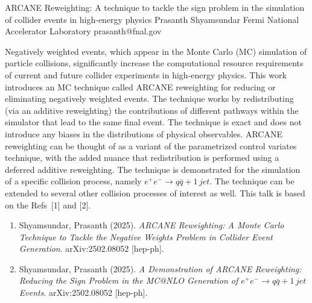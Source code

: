 \begin{talk}
  {ARCANE Reweighting: A technique to tackle the sign problem in the simulation of collider events in high-energy physics}%
  {Prasanth Shyamsundar}%
  {Fermi National Accelerator Laboratory}%
  {prasanth@fnal.gov}%
  {}%
  
    
   

Negatively weighted events, which appear in the Monte Carlo (MC) simulation of particle collisions, significantly increase the computational resource requirements of current and future collider experiments in high-energy physics. This work introduces an MC technique called ARCANE reweighting for reducing or eliminating negatively weighted events. The technique works by redistributing (via an additive reweighting) the contributions of different pathways within the simulator that lead to the same final event. The technique is exact and does not introduce any biases in the distributions of physical observables. ARCANE reweighting can be thought of as a variant of the parametrized control variates technique, with the added nuance that redistribution is performed using a deferred additive reweighting. The technique is demonstrated for the simulation of a specific collision process, namely $e^+ e^- \longrightarrow q \bar{q} + 1\,jet$. The technique can be extended to several other collision processes of interest as well. This talk is based on the Refs~[1] and [2].

\medskip

\begin{enumerate}
    \item[{[1]}] Shyamsundar, Prasanth (2025). {\it ARCANE Reweighting: A Monte Carlo Technique to Tackle the Negative Weights Problem in Collider Event Generation}. arXiv:2502.08052 [hep-ph].
    \item[{[2]}] Shyamsundar, Prasanth (2025). {\it A Demonstration of ARCANE Reweighting: Reducing the Sign Problem in the MC@NLO Generation of $e^+ e^- \longrightarrow q\bar{q} + 1\,jet$ Events}. arXiv:2502.08052 [hep-ph].
\end{enumerate}


\end{talk}
